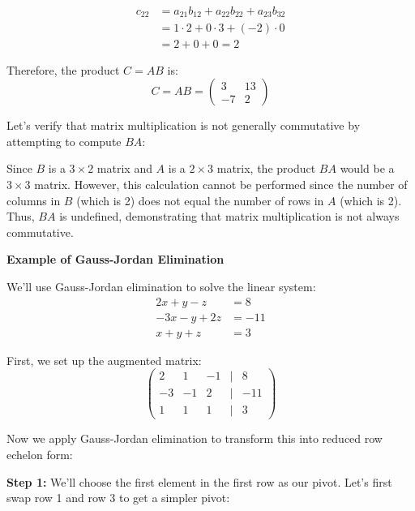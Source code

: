\begin{align*}
c_{22} &= a_{21}b_{12} + a_{22}b_{22} + a_{23}b_{32} \\
&= 1 \cdot 2 + 0 \cdot 3 + (-2) \cdot 0 \\
&= 2 + 0 + 0 = 2
\end{align*}

Therefore, the product \(C = AB\) is:
\begin{equation*}
C = AB = 
\begin{pmatrix}
3 & 13 \\
-7 & 2
\end{pmatrix}
\end{equation*}

Let's verify that matrix multiplication is not generally commutative by attempting to compute \(BA\):
\vspace{\baselineskip}

Since \(B\) is a \(3 \times 2\) matrix and \(A\) is a \(2 \times 3\) matrix, the product \(BA\) would be a \(3 \times 3\) matrix. However, this calculation cannot be performed since the number of columns in \(B\) (which is 2) does not equal the number of rows in \(A\) (which is 2). Thus, \(BA\) is undefined, demonstrating that matrix multiplication is not always commutative.
\vspace{\baselineskip}

\textbf{Example of Gauss-Jordan Elimination}
\vspace{\baselineskip}

We'll use Gauss-Jordan elimination to solve the linear system:
\begin{align*}
2x + y - z &= 8 \\
-3x - y + 2z &= -11 \\
x + y + z &= 3
\end{align*}

First, we set up the augmented matrix:
\begin{equation*}
\begin{pmatrix}
2 & 1 & -1 & | & 8 \\
-3 & -1 & 2 & | & -11 \\
1 & 1 & 1 & | & 3
\end{pmatrix}
\end{equation*}

Now we apply Gauss-Jordan elimination to transform this into reduced row echelon form:
\vspace{\baselineskip}

\textbf{Step 1:} We'll choose the first element in the first row as our pivot. Let's first swap row 1 and row 3 to get a simpler pivot:

